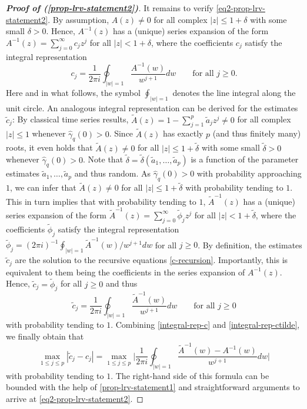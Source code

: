\begin{proof}[\textnormal{\textbf{Proof of (\ref{prop-lrv-statement2})}}]
It remains to verify \eqref{eq2-prop-lrv-statement2}. By assumption, $A(z) \ne 0$ for all complex $|z| \le 1 + \delta$ with some small $\delta > 0$. Hence, $A^{-1}(z)$ has a (unique) series expansion of the form $A^{-1}(z) = \sum_{j=0}^{\infty} c_j z^j$ for all $|z| < 1 + \delta$, where the coefficients $c_j$ satisfy the integral representation 
\begin{equation}\label{integral-rep-c}
c_j = \frac{1}{2 \pi i} \oint_{|w|=1} \frac{A^{-1}(w)}{w^{j+1}} dw \qquad \text{for all } j \ge 0. 
\end{equation}
Here and in what follows, the symbol $\oint_{|w|=1}$ denotes the line integral along the unit circle. An analogous integral representation can be derived for the estimates $\widetilde{c}_j$: By classical time series results, $\widetilde{A}(z) = 1 - \sum_{j=1}^p \widetilde{a}_j z^j \ne 0$ for all complex $|z| \le 1$ whenever $\widehat{\gamma}_q(0) > 0$. Since $\widetilde{A}(z)$ has exactly $p$ (and thus finitely many) roots, it even holds that $\widetilde{A}(z) \ne 0$ for all $|z| \le 1 + \widetilde{\delta}$ with some small $\widetilde{\delta} > 0$ whenever $\widehat{\gamma}_q(0) > 0$. Note that $\widetilde{\delta} = \widetilde{\delta}(\widetilde{a}_1,\ldots,\widetilde{a}_p)$ is a function of the parameter estimates $\widetilde{a}_1,\ldots,\widetilde{a}_p$ and thus random. As $\widehat{\gamma}_q(0) > 0$ with probability approaching $1$, we can infer that $\widetilde{A}(z) \ne 0$ for all $|z| \le 1 + \widetilde{\delta}$ with probability tending to $1$. This in turn implies that with probability tending to $1$, $\widetilde{A}^{-1}(z)$ has a (unique) series expansion of the form $\widetilde{A}^{-1}(z) = \sum_{j=0}^{\infty} \widetilde{\phi}_j z^j$ for all $|z| < 1 + \widetilde{\delta}$, where the coefficients $\widetilde{\phi}_j$ satisfy the integral representation $\widetilde{\phi}_j = (2 \pi i)^{-1} \oint_{|w|=1} \widetilde{A}^{-1}(w) / w^{j+1} dw$ for all $j \ge 0$. By definition, the estimates $\widetilde{c}_j$ are the solution to the recursive equations \eqref{c-recursion}. Importantly, this is equivalent to them being the coefficients in the series expansion of $A^{-1}(z)$. Hence, $\widetilde{c}_j = \widetilde{\phi}_j$ for all $j \ge 0$ and thus 
\begin{equation}\label{integral-rep-ctilde}
\widetilde{c}_j = \frac{1}{2 \pi i} \oint_{|w|=1} \frac{\widetilde{A}^{-1}(w)}{w^{j+1}} dw \qquad \text{for all } j \ge 0 
\end{equation} 
with probability tending to $1$. Combining \eqref{integral-rep-c} and \eqref{integral-rep-ctilde}, we finally obtain that  
\[ \max_{1 \le j \le p} |\widetilde{c}_j - c_j| = \max_{1 \le j \le p} \Big| \frac{1}{2 \pi i} \oint_{|w|=1} \frac{\widetilde{A}^{-1}(w) - A^{-1}(w)}{w^{j+1}} dw \Big| \]
with probability tending to $1$. The right-hand side of this formula can be bounded with the help of \eqref{prop-lrv-statement1} and straightforward arguments to arrive at \eqref{eq2-prop-lrv-statement2}. 
\end{proof}


